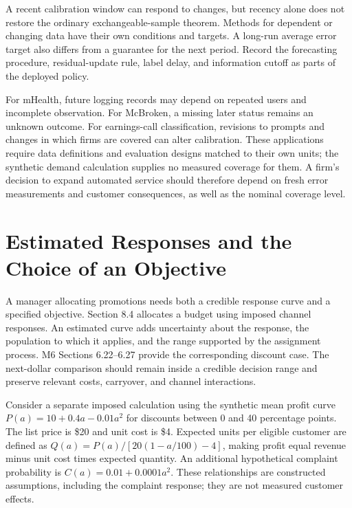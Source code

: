 A recent calibration window can respond to changes, but recency alone
does not restore the ordinary exchangeable-sample theorem. Methods for
dependent or changing data have their own conditions and targets. A
long-run average error target also differs from a guarantee for the next
period. Record the forecasting procedure, residual-update rule, label
delay, and information cutoff as parts of the deployed policy.

For mHealth, future logging records may depend on repeated users and
incomplete observation. For McBroken, a missing later status remains an
unknown outcome. For earnings-call classification, revisions to prompts
and changes in which firms are covered can alter calibration. These
applications require data definitions and evaluation designs matched to
their own units; the synthetic demand calculation supplies no measured
coverage for them. A firm's decision to expand automated service should
therefore depend on fresh error measurements and customer consequences,
as well as the nominal coverage level.

\hypertarget{M08-estimated-responses-and-the-choice-of-an-objective}{%
\section{Estimated Responses and the Choice of an
Objective}\label{M08-estimated-responses-and-the-choice-of-an-objective}}

\noindent \noindent A manager allocating promotions needs both a credible response
curve and a specified objective. Section 8.4 allocates a budget using
imposed channel responses. An estimated curve adds uncertainty about the
response, the population to which it applies, and the range supported by
the assignment process. M6 Sections 6.22--6.27 provide the corresponding
discount case. The next-dollar comparison should remain inside a
credible decision range and preserve relevant costs, carryover, and
channel interactions.

Consider a separate imposed calculation using the synthetic mean profit
curve \(P(a)=10+0.4a-0.01a^2\) for discounts between 0 and 40 percentage
points. The list price is \$20 and unit cost is \$4. Expected units per
eligible customer are defined as \(Q(a)=P(a)/[20(1-a/100)-4]\), making
profit equal revenue minus unit cost times expected quantity. An
additional hypothetical complaint probability is
\(C(a)=0.01+0.0001a^2\). These relationships are constructed
assumptions, including the complaint response; they are not measured
customer effects.

